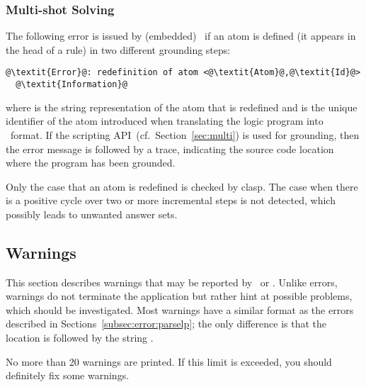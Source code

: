 \subsubsection{Multi-shot Solving}
The following error is issued by (embedded) \clasp\ if an atom is defined (it appears in the head of a rule) in two different grounding steps:
\begin{lstlisting}[numbers=none,escapechar=@]
@\textit{Error}@: redefinition of atom <@\textit{Atom}@,@\textit{Id}@>
  @\textit{Information}@
\end{lstlisting}
where  is the string representation of the atom that is redefined
and  is the unique identifier of the atom introduced when translating the logic program into \smodels\ format.
If the scripting API~(cf.~Section~\ref{sec:multi}) is used for grounding,
then the error message is followed by a trace,
indicating the source code location where the program has been grounded.

\begin{note}
Only the case that an atom is redefined is checked by clasp.
The case when there is a positive cycle over two or more incremental steps is not detected,
which possibly leads to unwanted answer sets.
\end{note}

\subsection{Warnings}\label{subsec:warn}

This section describes warnings that may be reported by \gringo\ or \clingo.
Unlike errors, warnings do not terminate the application 
but rather hint at possible problems, which should be investigated.
Most warnings have a similar format as the errors described in Sections~\ref{subsec:error:parselp};
the only difference is that the location is followed by the string .

\begin{note}
No more than 20 warnings are printed.
If this limit is exceeded, you should definitely fix some warnings.
\end{note}

